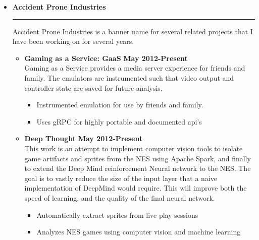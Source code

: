\documentclass[overlapped]{res}
\begin{document}
\begin{resume}
\begin{itemize}[leftmargin=0in]
    \item[] \textbf{Accident Prone Industries} \\[-0.1in] \rule{\textwidth}{0.5pt}
    Accident Prone Industries is a banner name for several related projects that I have been working on for several years.
        \begin{itemize}[leftmargin=0in]
            \item[] 
                \begin{samepage}
                    \textbf{Gaming as a Service: GaaS} \hfill \textbf{May 2012-Present} \\
                    Gaming as a Service provides a media server experience for friends and family. The emulators are instrumented such that 
                    video output and controller state are saved for future analysis.
                    \begin{itemize}
                        \item[\textbullet] Instrumented emulation for use by friends and family.
                        \item[\textbullet] Uses gRPC for highly portable and documented api's
                    \end{itemize}
                \end{samepage}
            \item[] 
                \begin{samepage}
                    \textbf{Deep Thought} \hfill \textbf{May 2012-Present} \\
                    This work is an attempt to implement computer vision tools to isolate game artifacts and 
                    sprites from the NES using Apache Spark, and finally to extend the Deep Mind reinforcement Neural network to the NES. 
                    The goal is to vastly reduce the size of the input layer that a naive implementation of DeepMind would require. 
                    This will improve both the speed of learning, and the quality of the final neural network.
                    \begin{itemize}
                        \item[\textbullet] Automatically extract sprites from live play sessions
                        \item[\textbullet] Analyzes NES games using computer vision and machine learning

\end{itemize}
\end{samepage}
\end{itemize}
\end{itemize}
\end{resume}
\end{document}

